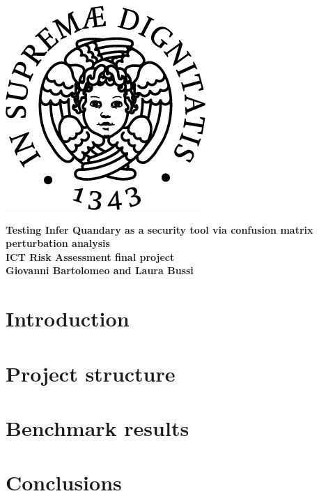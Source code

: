 \documentclass{article}
\begin{document}
\begin{titlepage}
\begin{center}
\includegraphics[scale=0.5]{unipi.png}
\end{center}

\begin{center}
	\vspace{5mm}
    {\LARGE{\bf Testing Infer Quandary as a security tool 
via confusion matrix perturbation analysis}}\\
    \vspace{5mm}
    {\large{\bf ICT Risk Assessment final project}}\\
    \vspace{2.5mm}
	{\large{\bf Giovanni Bartolomeo and Laura Bussi}}\\
\end{center}
\end{titlepage}

\section{Introduction}\label{sec:intro}



\section{Project structure}\label{sec:project}



\section{Benchmark results}\label{sec:results}



\section{Conclusions}\label{sec:conclusions}


\end{document}

